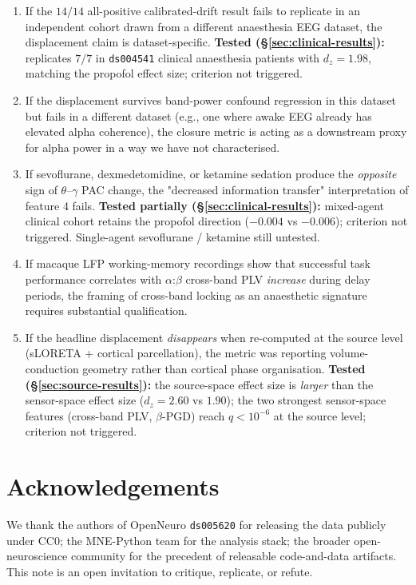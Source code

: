 \documentclass[11pt,a4paper]{article}
\begin{document}
\begin{enumerate}\itemsep0pt
\item If the $14/14$ all-positive calibrated-drift result fails to replicate in an independent cohort drawn from a different anaesthesia EEG dataset, the displacement claim is dataset-specific. \textbf{Tested (\S\ref{sec:clinical-results}):} replicates $7/7$ in \texttt{ds004541} clinical anaesthesia patients with $d_z=1.98$, matching the propofol effect size; criterion not triggered.
\item If the displacement survives band-power confound regression in this dataset but fails in a different dataset (e.g., one where awake EEG already has elevated alpha coherence), the closure metric is acting as a downstream proxy for alpha power in a way we have not characterised.
\item If sevoflurane, dexmedetomidine, or ketamine sedation produce the \emph{opposite} sign of $\theta$--$\gamma$ PAC change, the "decreased information transfer" interpretation of feature 4 fails. \textbf{Tested partially (\S\ref{sec:clinical-results}):} mixed-agent clinical cohort retains the propofol direction ($-0.004$ vs $-0.006$); criterion not triggered. Single-agent sevoflurane / ketamine still untested.
\item If macaque LFP working-memory recordings show that successful task performance correlates with $\alpha$:$\beta$ cross-band PLV \emph{increase} during delay periods, the framing of cross-band locking as an anaesthetic signature requires substantial qualification.
\item If the headline displacement \emph{disappears} when re-computed at the source level (sLORETA + cortical parcellation), the metric was reporting volume-conduction geometry rather than cortical phase organisation. \textbf{Tested (\S\ref{sec:source-results}):} the source-space effect size is \emph{larger} than the sensor-space effect size ($d_z=2.60$ vs $1.90$); the two strongest sensor-space features (cross-band PLV, $\beta$-PGD) reach $q<10^{-6}$ at the source level; criterion not triggered.
\end{enumerate}

\section*{Acknowledgements}

We thank the authors of OpenNeuro \texttt{ds005620} for releasing the data publicly under CC0; the MNE-Python team for the analysis stack; the broader open-neuroscience community for the precedent of releasable code-and-data artifacts. This note is an open invitation to critique, replicate, or refute.



\end{document}
